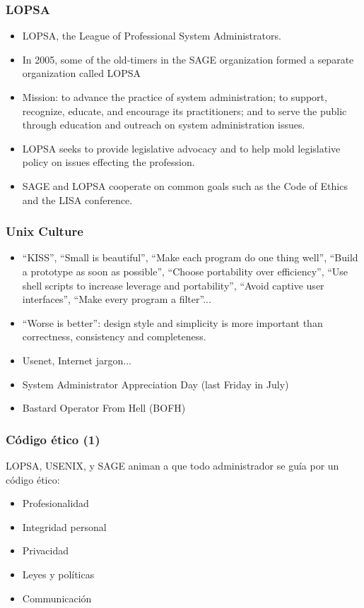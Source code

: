 \documentclass{beamer}
\begin{document}


\begin{frame}
\frametitle{LOPSA}

\begin{itemize}
\item LOPSA, the League of Professional System Administrators.
\item In 2005, some of the old-timers in the SAGE organization formed a separate organization called LOPSA
\item Mission: to advance the practice of system administration; to support, recognize, educate, and encourage its practitioners; and to serve the public through education and outreach on system administration issues.
\item LOPSA seeks to provide legislative advocacy and to help mold legislative policy on issues effecting the profession. 
\item SAGE and LOPSA cooperate on common goals such as the Code of Ethics and the LISA conference.
\end{itemize}
\end{frame}


\begin{frame}
\frametitle{Unix Culture}

\begin{itemize}
\item ``KISS'', ``Small is beautiful'', ``Make each program do one thing well'', ``Build a prototype as soon as possible'', ``Choose portability over efficiency'', ``Use shell scripts to increase leverage and portability'', ``Avoid captive user interfaces'', ``Make every program a filter''...
\item ``Worse is better'': design style and simplicity is more important than correctness, consistency and completeness.
\item Usenet, Internet jargon... 
\item System Administrator Appreciation Day (last Friday in July)
\item Bastard Operator From Hell (BOFH)
\end{itemize}
\end{frame}



\begin{frame}
\frametitle{Código ético (1)}

LOPSA, USENIX, y SAGE animan a que todo administrador se guía por un código ético:  

\begin{itemize}
\item Profesionalidad
\item Integridad personal
\item Privacidad
\item Leyes y políticas
\item Communicación
\end{itemize}
\end{frame}
\end{document}

